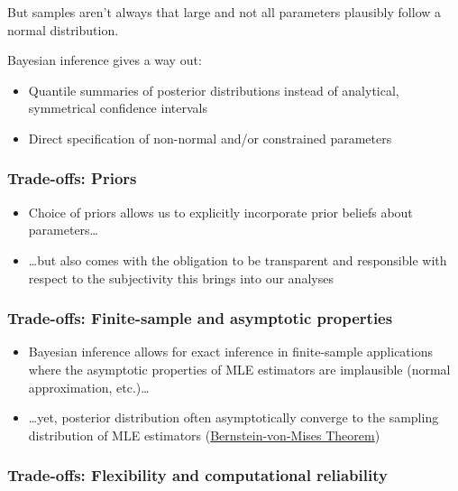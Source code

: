 \documentclass[
  11pt,
]{article}
\providecommand{\tightlist}{%
  \setlength{\itemsep}{0pt}\setlength{\parskip}{0pt}}
\begin{document}
But samples aren't always that large and not all parameters plausibly
follow a normal distribution.

Bayesian inference gives a way out:

\begin{itemize}
\tightlist
\item
  Quantile summaries of posterior distributions instead of analytical,
  symmetrical confidence intervals
\item
  Direct specification of non-normal and/or constrained parameters
\end{itemize}

\hypertarget{trade-offs-priors}{%
\subsubsection{Trade-offs: Priors}\label{trade-offs-priors}}

\begin{itemize}
\tightlist
\item
  Choice of priors allows us to explicitly incorporate prior beliefs
  about parameters\ldots{}
\item
  \ldots but also comes with the obligation to be transparent and
  responsible with respect to the subjectivity this brings into our
  analyses
\end{itemize}

\hypertarget{trade-offs-finite-sample-and-asymptotic-properties}{%
\subsubsection{Trade-offs: Finite-sample and asymptotic properties}\label{trade-offs-finite-sample-and-asymptotic-properties}}

\begin{itemize}
\tightlist
\item
  Bayesian inference allows for exact inference in finite-sample
  applications where the asymptotic properties of MLE estimators are
  implausible (normal approximation, etc.)\ldots{}
\item
  \ldots yet, posterior distribution often asymptotically converge to the
  sampling distribution of MLE estimators (\href{https://en.wikipedia.org/wiki/Bernstein\%E2\%80\%93von_Mises_theorem}{Bernstein-von-Mises
  Theorem})
\end{itemize}

\hypertarget{trade-offs-flexibility-and-computational-reliability}{%
\subsubsection{Trade-offs: Flexibility and computational reliability}\label{trade-offs-flexibility-and-computational-reliability}}
\end{document}
